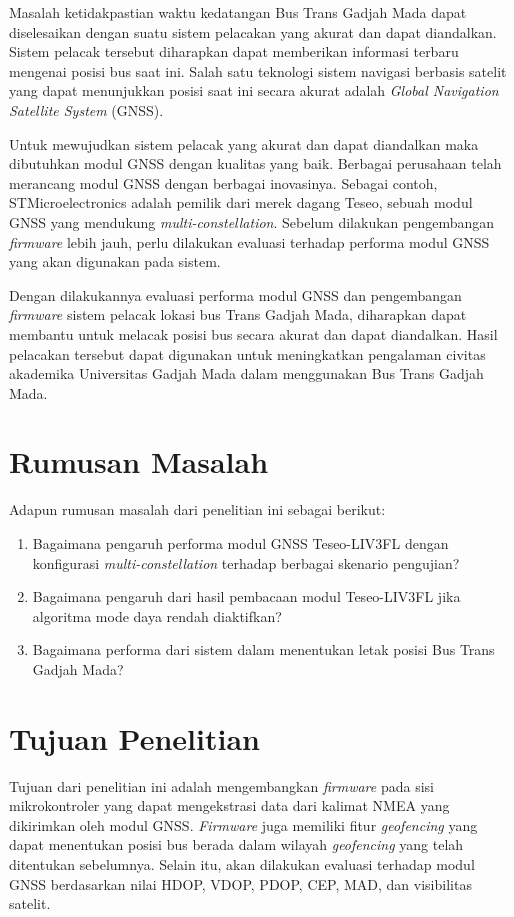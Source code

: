 Masalah ketidakpastian waktu kedatangan Bus Trans Gadjah Mada dapat diselesaikan dengan suatu sistem pelacakan yang akurat dan dapat diandalkan. Sistem pelacak tersebut diharapkan dapat memberikan informasi terbaru mengenai posisi bus saat ini. Salah satu teknologi sistem navigasi berbasis satelit yang dapat menunjukkan posisi saat ini secara akurat adalah \textit{Global Navigation Satellite System} (GNSS).

Untuk mewujudkan sistem pelacak yang akurat dan dapat diandalkan maka dibutuhkan modul GNSS dengan kualitas yang baik. Berbagai perusahaan telah merancang modul GNSS dengan berbagai inovasinya. Sebagai contoh, STMicroelectronics adalah pemilik dari merek dagang Teseo, sebuah modul GNSS yang mendukung \textit{multi-constellation}. Sebelum dilakukan pengembangan \textit{firmware} lebih jauh, perlu dilakukan evaluasi terhadap performa modul GNSS yang akan digunakan pada sistem.

Dengan dilakukannya evaluasi performa modul GNSS dan pengembangan \textit{firmware} sistem pelacak lokasi bus Trans Gadjah Mada, diharapkan dapat membantu untuk melacak posisi bus secara akurat dan dapat diandalkan. Hasil pelacakan tersebut dapat digunakan untuk meningkatkan pengalaman civitas akademika Universitas Gadjah Mada dalam menggunakan Bus Trans Gadjah Mada.

\section{Rumusan Masalah}
Adapun rumusan masalah dari penelitian ini sebagai berikut:
\begin{enumerate}
	\item Bagaimana pengaruh performa modul GNSS Teseo-LIV3FL dengan konfigurasi \textit{multi-constellation} terhadap berbagai skenario pengujian?
	\item Bagaimana pengaruh dari hasil pembacaan modul Teseo-LIV3FL jika algoritma mode daya rendah diaktifkan?
	\item Bagaimana performa dari sistem dalam menentukan letak posisi Bus Trans Gadjah Mada?
\end{enumerate}

\section{Tujuan Penelitian}
Tujuan dari penelitian ini adalah mengembangkan \textit{firmware} pada sisi mikrokontroler yang dapat mengekstrasi data dari kalimat NMEA yang dikirimkan oleh modul GNSS. \textit{Firmware} juga memiliki fitur \textit{geofencing} yang dapat menentukan posisi bus berada dalam wilayah \textit{geofencing} yang telah ditentukan sebelumnya. Selain itu, akan dilakukan evaluasi terhadap modul GNSS berdasarkan nilai HDOP, VDOP, PDOP, CEP, MAD, dan visibilitas satelit.

